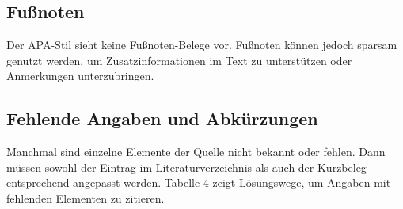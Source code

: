 \documentclass[
  letterpaper,
  DIV=11]{scrreprt}
\begin{document}
\hypertarget{fuuxdfnoten}{%
\subsection{Fußnoten}\label{fuuxdfnoten}}

Der APA-Stil sieht keine Fußnoten-Belege vor. Fußnoten können jedoch
sparsam genutzt werden, um Zusatzinformationen im Text zu unterstützen
oder Anmerkungen unterzubringen.

\hypertarget{fehlende-angaben-und-abkuxfcrzungen}{%
\subsection{Fehlende Angaben und
Abkürzungen}\label{fehlende-angaben-und-abkuxfcrzungen}}

Manchmal sind einzelne Elemente der Quelle nicht bekannt oder fehlen.
Dann müssen sowohl der Eintrag im Literaturverzeichnis als auch der
Kurzbeleg entsprechend angepasst werden. Tabelle 4 zeigt Lösungswege, um
Angaben mit fehlenden Elementen zu zitieren.
\end{document}

